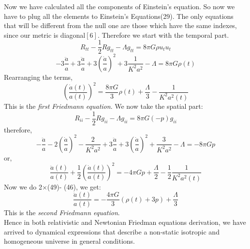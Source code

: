 \documentclass[14pt]{extarticle}
\begin{document}
Now we have calculated all the components of Einstein's equation. So now we have to plug all the elements to Einstein's Equations(29). The only equations that will be different from the null one  are  those  which  have the same indexes, since our metric is diagonal$[6]$. Therefore we start with the temporal part.\\
\begin{equation}
R_{t t}-\frac{1}{2} R g_{t t}-\Lambda g_{t t}=8 \pi G \rho u_{t} u_{t}
\end{equation}
\begin{equation}
-3 \frac{\ddot{a}}{a}+3 \frac{\ddot{a}}{a}+3\left(\frac{\dot{a}}{a}\right)^{2}+3 \frac{1}{K^{2} a^{2}}-\Lambda=8 \pi G \rho(t)
\end{equation}
Rearranging the terms,\\
\begin{equation}
\left(\frac{\dot{a}(t)}{a(t)}\right)^{2}=\frac{8 \pi G}{3} \rho(t)+\frac{\Lambda}{3}-\frac{1}{K^{2} a^{2}(t)}
\end{equation}
This is the \textit{first Friedmann equation}. We now take the spatial part:\\
\begin{equation}
R_{i i}-\frac{1}{2} R g_{i i}-\Lambda g_{i i}=8 \pi G(-p) g_{i i}
\end{equation}
therefore,\\
\begin{equation}
-\frac{\ddot{a}}{a}-2\left(\frac{\dot{a}}{a}\right)^{2}-\frac{2}{K^{2} a^{2}}+3 \frac{\ddot{a}}{a}+3\left(\frac{\dot{a}}{a}\right)^{2}+\frac{3}{K^{2} a^{2}}-\Lambda=-8 \pi G p
\end{equation}
or,\\
\begin{equation}
\frac{\ddot{a}(t)}{a(t)}+\frac{1}{2}\left(\frac{\dot{a}(t)}{a(t)}\right)^{2}=-4 \pi G p+\frac{\Lambda}{2}-\frac{1}{2} \frac{1}{K^{2} a^{2}(t)}
\end{equation}
Now we do 2$\times$(49)- (46), we get:\\
\begin{equation}
\frac{\ddot{a}(t)}{a(t)}=-\frac{4 \pi G}{3}(\rho(t)+3 p)+\frac{\Lambda}{3}
\end{equation}
This is the \textit{second Friedmann equation}.\\
Hence in both relativistic and Newtonian Friedman equations derivation, we have arrived to dynamical expressions  that  describe a non-static  isotropic and homogeneous universe in general conditions. 
\end{document}
